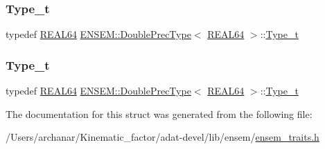 \mbox{\label{structENSEM_1_1DoublePrecType_3_01REAL64_01_4_aa802de703a59b214ae8bb817ec704252}} 
\subsubsection{\texorpdfstring{Type\_t}{Type\_t}\hspace{0.1cm}{\footnotesize\ttfamily [2/3]}}
{\footnotesize\ttfamily typedef \mbox{\hyperlink{namespaceENSEM_a85b215b9f1f43715aebee01718e25082}{R\+E\+A\+L64}} \mbox{\hyperlink{structENSEM_1_1DoublePrecType}{E\+N\+S\+E\+M\+::\+Double\+Prec\+Type}}$<$ \mbox{\hyperlink{namespaceENSEM_a85b215b9f1f43715aebee01718e25082}{R\+E\+A\+L64}} $>$\+::\mbox{\hyperlink{structENSEM_1_1DoublePrecType_3_01REAL64_01_4_aa802de703a59b214ae8bb817ec704252}{Type\+\_\+t}}}

\mbox{\label{structENSEM_1_1DoublePrecType_3_01REAL64_01_4_aa802de703a59b214ae8bb817ec704252}} 
\subsubsection{\texorpdfstring{Type\_t}{Type\_t}\hspace{0.1cm}{\footnotesize\ttfamily [3/3]}}
{\footnotesize\ttfamily typedef \mbox{\hyperlink{namespaceENSEM_a85b215b9f1f43715aebee01718e25082}{R\+E\+A\+L64}} \mbox{\hyperlink{structENSEM_1_1DoublePrecType}{E\+N\+S\+E\+M\+::\+Double\+Prec\+Type}}$<$ \mbox{\hyperlink{namespaceENSEM_a85b215b9f1f43715aebee01718e25082}{R\+E\+A\+L64}} $>$\+::\mbox{\hyperlink{structENSEM_1_1DoublePrecType_3_01REAL64_01_4_aa802de703a59b214ae8bb817ec704252}{Type\+\_\+t}}}



The documentation for this struct was generated from the following file\+:\begin{DoxyCompactItemize}
\item 
/\+Users/archanar/\+Kinematic\+\_\+factor/adat-\/devel/lib/ensem/\mbox{\hyperlink{adat-devel_2lib_2ensem_2ensem__traits_8h}{ensem\+\_\+traits.\+h}}\end{DoxyCompactItemize}
